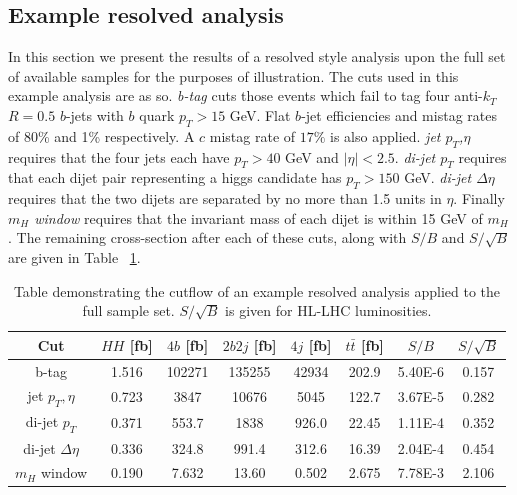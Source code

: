 \documentclass[12pt]{article}
\begin{document}
\subsection{Example resolved analysis}
In this section we present the results of a resolved style analysis upon the full set of available samples for the purposes of illustration. The cuts used in this example analysis are as so. \emph{b-tag} cuts those events which fail to tag four anti-$k_T$ $R=0.5$ $b$-jets with $b$ quark $p_T > 15$ GeV. Flat $b$-jet efficiencies and mistag rates of 80\% and 1\% respectively. A $c$ mistag rate of $17\%$ is also applied.  \emph{jet $p_T$,$\eta$} requires that the four jets each have $p_T>40$ GeV and $|\eta|< 2.5$. \emph{di-jet $p_T$} requires that each dijet pair representing a higgs candidate has $p_T>150 $ GeV. \emph{di-jet $\Delta\eta$} requires that the two dijets are separated by no more than 1.5 units in $\eta$. Finally \emph{$m_H$ window} requires that the invariant mass of each dijet is within 15 GeV of $m_H$. The remaining cross-section after each of these cuts, along with $S/B$ and $S/\sqrt{B}$ are given in Table ~\ref{tab:resCutflow}.

\begin{table}[htdp]
\begin{center}
\begin{tabular}{|c||c||c|c|c|c||c|c|}
\hline
Cut 					& $HH$ [fb] & $4b$ [fb] & $2b2j$ [fb] & $4j$ [fb] & $t\bar{t}$ [fb] & $S/B$ & $S/\sqrt{B}$ \\
\hline
\hline
b-tag    	& 1.516 &      102271         & 135255        & 42934  	&	202.9	&5.40E-6	& 0.157\\
jet $p_T,\eta$         & 0.723 &        3847      & 10676       & 5045 	&	122.7	&3.67E-5	& 0.282\\
di-jet $p_T$           	& 0.371&      553.7        & 1838	  & 926.0	&	22.45	&1.11E-4	& 0.352\\
di-jet $\Delta\eta$   & 0.336&       324.8       & 991.4 	  & 312.6		&	16.39	&2.04E-4	& 0.454\\
\hline
$m_H$ window   &0.190 &          7.632      & 13.60	  & 0.502	&	2.675	&7.78E-3	& 2.106\\
\hline
\end{tabular}
\end{center}
\caption{Table demonstrating the cutflow of an example resolved analysis applied to the full sample set.  $S/\sqrt{B}$ is given for HL-LHC luminosities.}
\label{tab:resCutflow}
\end{table}%
\end{document}
